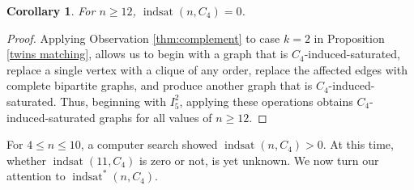 \documentclass[12pt]{amsart}
\theoremstyle{plain}
\newtheorem{cor}{Corollary}[thm]
\theoremstyle{definition}
\theoremstyle{remark}
\newcommand{\indsat}[2]{\ensuremath{\operatorname{indsat}(#1,#2)}\xspace}
\newcommand{\sis}[2]{\ensuremath{{\operatorname{indsat}}^*(#1,#2)}\xspace}
\begin{document}
\begin{cor}
For $n \ge 12$, $\indsat{n}{C_4} = 0$.
\end{cor}

\begin{proof}
Applying Observation \ref{thm:complement} to case $k = 2$ in Proposition \ref{twins matching}, allows us to begin with a graph that is $C_4$-induced-saturated, replace a single vertex with a clique of any order, replace the affected edges with complete bipartite graphs, and produce another graph that is $C_4$-induced-saturated.  Thus, beginning with $I_5^2$, applying these operations obtains $C_4$-induced-saturated graphs for all values of $n \ge 12$.
\end{proof}

For $4 \le n \le 10$, a computer search showed $\indsat{n}{C_4} > 0$.  At this time, whether $\indsat{11}{C_4}$ is zero or not, is yet unknown.  We now turn our attention to $\sis{n}{C_4}$.
\end{document}
